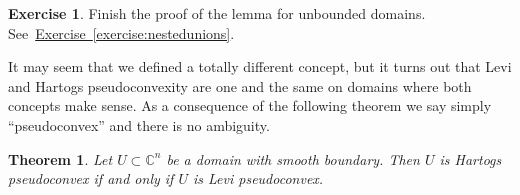 \documentclass[12pt,openany]{book}
\newcommand{\C}{{\mathbb{C}}}
\theoremstyle{plain}
\newtheorem{thm}{Theorem}[section]
\theoremstyle{remark}
\theoremstyle{definition}
\newenvironment{exbox}{%
    \def\FrameCommand{\vrule width 1pt \relax\hspace{10pt}}%
    \MakeFramed{\advance\hsize-\width\FrameRestore}%
}{%
    \endMakeFramed
}
\theoremstyle{exercise}
\newtheorem{exercise}{Exercise}[section]
\theoremstyle{example}
\newcommand{\exerciseref}[1]{\hyperref[#1]{Exercise~\ref*{#1}}}
\begin{document}
\begin{exbox}
\begin{exercise}
Finish the proof of the lemma for unbounded domains.
See~\exerciseref{exercise:nestedunions}.
\end{exercise}
\end{exbox}



It may seem that we defined a totally different concept, but it turns
out that Levi and Hartogs pseudoconvexity are one and the same on domains
where both concepts make sense.
As a consequence of the following theorem we say simply ``pseudoconvex'' and there
is no ambiguity.

\begin{thm}
Let $U \subset \C^n$ be a domain with smooth boundary.
Then $U$ is Hartogs pseudoconvex if and only if $U$ is Levi pseudoconvex.
\end{thm}
\end{document}
